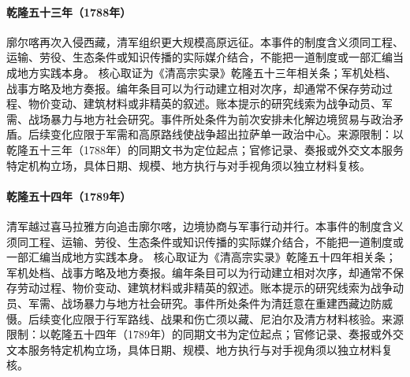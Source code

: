 \hypertarget{civic:EQ-1788-SECOND-GURKHA-WAR}{}\paragraph{乾隆五十三年（1788年）}廓尔喀再次入侵西藏，清军组织更大规模高原远征。本事件的制度含义须同工程、运输、劳役、生态条件或知识传播的实际媒介结合，不能把一道制度或一部汇编当成地方实践本身。 核心取证为《清高宗实录》乾隆五十三年相关条；军机处档、战事方略及地方奏报。编年条目可以为行动建立相对次序，却通常不保存劳动过程、物价变动、建筑材料或非精英的叙述。账本提示的研究线索为战争动员、军需、战场暴力与地方社会研究。事件所处条件为前次安排未化解边境贸易与政治矛盾。后续变化应限于军需和高原路线使战争超出拉萨单一政治中心。来源限制：以乾隆五十三年（1788年）的同期文书为定位起点；官修记录、奏报或外交文本服务特定机构立场，具体日期、规模、地方执行与对手视角须以独立材料复核。
\hypertarget{civic:EQ-1789-TIBET-NEPAL-CAMPAIGN}{}\paragraph{乾隆五十四年（1789年）}清军越过喜马拉雅方向追击廓尔喀，边境协商与军事行动并行。本事件的制度含义须同工程、运输、劳役、生态条件或知识传播的实际媒介结合，不能把一道制度或一部汇编当成地方实践本身。 核心取证为《清高宗实录》乾隆五十四年相关条；军机处档、战事方略及地方奏报。编年条目可以为行动建立相对次序，却通常不保存劳动过程、物价变动、建筑材料或非精英的叙述。账本提示的研究线索为战争动员、军需、战场暴力与地方社会研究。事件所处条件为清廷意在重建西藏边防威慑。后续变化应限于行军路线、战果和伤亡须以藏、尼泊尔及清方材料核验。来源限制：以乾隆五十四年（1789年）的同期文书为定位起点；官修记录、奏报或外交文本服务特定机构立场，具体日期、规模、地方执行与对手视角须以独立材料复核。
